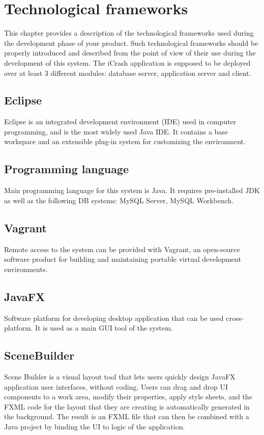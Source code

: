 \chapter{Technological frameworks}
\label{chap:techFrm}


This chapter provides a description of the technological frameworks used during the development phase of your product. Such technological frameworks should be properly introduced and described from the point of view of their use during the development of this system. The iCrash application is supposed to be deployed over at least 3 different modules: database server, application server and client.


\section{Eclipse}
\label{sec:Eclipse}
Eclipse is an integrated development environment (IDE) used in computer programming, and is the most widely used Java IDE. It contains a base workspace and an extensible plug-in system for customizing the environment. 

\section{Programming language}
\label{sec:Programming language}
Main programming language for this system is Java. It requires pre-installed JDK as well as the following DB systems: MySQL Server, MySQL Workbench.


\section{Vagrant}
\label{sec:Vagrant}
Remote access to the system can be provided with Vagrant, an open-source software product for building and maintaining portable virtual development environments.


\section{JavaFX}
\label{sec:JavaFX}
Software platform for developing desktop application that can be used cross-platform. It is used as a main GUI tool of the system.

\section{SceneBuilder}
\label{sec:SceneBuilder}
Scene Builder is a visual layout tool that lets users quickly design JavaFX
application user interfaces, without coding. Users can drag and drop UI
components to a work area, modify their properties, apply style sheets, and the
FXML code for the layout that they are creating is automatically generated in
the background. The result is an FXML file that can then be combined with a Java
project by binding the UI to logic of the application.




